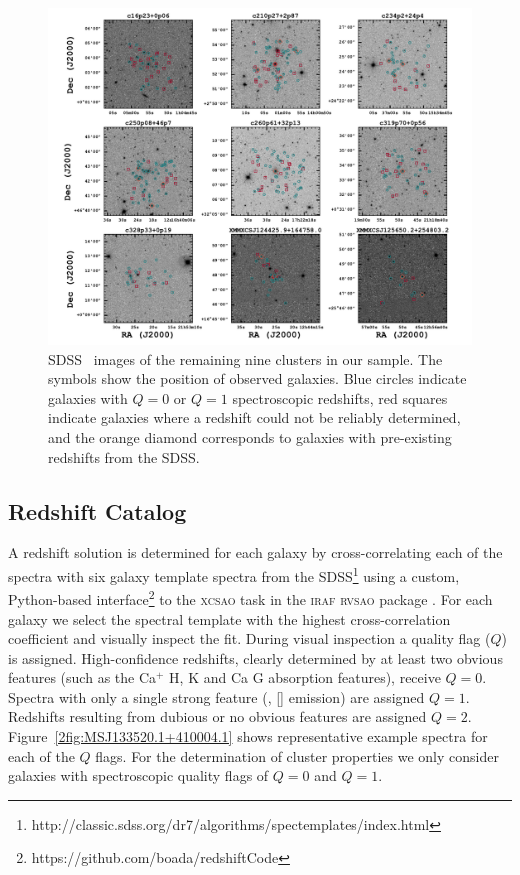 \begin{figure}[!ht]
	\begin{center}
		\includegraphics[width=\textwidth]{figures2/multimontage.pdf}
	\end{center}
	\caption[Montage of remaining nine clusters]{SDSS \sdssr\ images of the remaining nine clusters in our sample. The symbols show the position of observed galaxies. Blue circles indicate galaxies with $Q=0$ or $Q=1$ spectroscopic redshifts, red squares indicate galaxies where a redshift could not be reliably determined, and the orange diamond corresponds to galaxies with pre-existing redshifts from the SDSS.}  
	\label{2fig:multimontage} 
\end{figure}

\subsection{Redshift Catalog}\label{2sec:redshift catalog} 
A redshift solution is determined for each galaxy by cross-correlating \citep{Tonry1979} each of the spectra with six galaxy template spectra from the SDSS\footnote{http://classic.sdss.org/dr7/algorithms/spectemplates/index.html} using a custom, Python-based interface\footnote{https://github.com/boada/redshiftCode} to the \textsc{xcsao} task in the \textsc{iraf} \textsc{rvsao} package \citep{Kurtz1992, Kurtz1998}. For each galaxy we select the spectral template with the highest cross-correlation coefficient and visually inspect the fit. During visual inspection a quality flag ($Q$) is assigned. High-confidence redshifts, clearly determined by at least two obvious features (such as the Ca$^+$ H, K and Ca G absorption features), receive $Q=0$. Spectra with only a single strong feature (\eg, \hbox{[]} emission) are assigned $Q=1$. Redshifts resulting from dubious or no obvious features are assigned $Q=2$. Figure~\ref{2fig:MSJ133520.1+410004.1} shows representative example spectra for each of the $Q$ flags. For the determination of cluster properties we only consider galaxies with spectroscopic quality flags of $Q=0$ and $Q=1$. 

